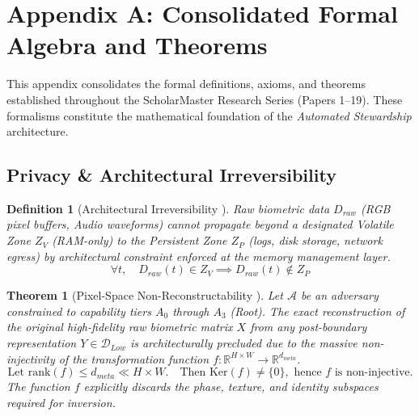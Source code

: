\documentclass[conference]{IEEEtran}
\newtheorem{theorem}{Theorem}
\newtheorem{definition}{Definition}
\begin{document}
\section*{Appendix A: Consolidated Formal Algebra and Theorems}
\label{sec:appendix_theorems}

This appendix consolidates the formal definitions, axioms, and theorems established throughout the ScholarMaster Research Series (Papers 1--19). These formalisms constitute the mathematical foundation of the \textit{Automated Stewardship} architecture.

\subsection{Privacy & Architectural Irreversibility}

\begin{definition}[Architectural Irreversibility \cite{P3, P17}]
Raw biometric data $D_{raw}$ (RGB pixel buffers, Audio waveforms) cannot propagate beyond a designated \textit{Volatile Zone} $Z_V$ (RAM-only) to the \textit{Persistent Zone} $Z_P$ (logs, disk storage, network egress) by architectural constraint enforced at the memory management layer.
\begin{equation}
\forall t, \quad D_{raw}(t) \in Z_V \implies D_{raw}(t) \notin Z_P
\end{equation}
\end{definition}

\begin{theorem}[Pixel-Space Non-Reconstructability \cite{P19}]
Let $\mathcal{A}$ be an adversary constrained to capability tiers $A_0$ through $A_3$ (Root). The exact reconstruction of the original high-fidelity raw biometric matrix $X$ from any post-boundary representation $Y \in \mathcal{D}_{Low}$ is architecturally precluded due to the massive non-injectivity of the transformation function $f: \mathbb{R}^{H \times W} \to \mathbb{R}^{d_{meta}}$.
\begin{equation}
\text{Let } \text{rank}(f) \le d_{meta} \ll H \times W. \quad \text{Then } \text{Ker}(f) \neq \{0\}, \text{ hence } f \text{ is non-injective.}
\end{equation}
The function $f$ explicitly discards the phase, texture, and identity subspaces required for inversion.
\end{theorem}
\end{document}

